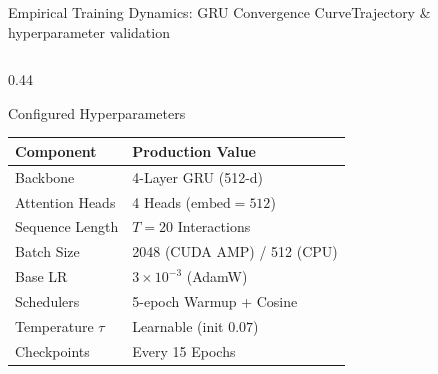 \documentclass[aspectratio=169,10pt]{beamer}
\begin{document}
\begin{frame}{Empirical Training Dynamics: GRU Convergence Curve}{Trajectory \& hyperparameter validation}
\begin{columns}[c]
        \begin{column}{0.44\textwidth}
            \begin{block}{Configured Hyperparameters}
                \fontsize{6pt}{8pt}\selectfont
                \begin{tabular}{ll}
                    \toprule
                    \textbf{Component} & \textbf{Production Value} \\
                    \midrule
                    Backbone & 4-Layer GRU (512-d) \\
                    Attention Heads & 4 Heads ($\text{embed}=512$) \\
                    Sequence Length & $T = 20$ Interactions \\
                    Batch Size & 2048 (CUDA AMP) / 512 (CPU) \\
                    Base LR & $3 \times 10^{-3}$ (AdamW) \\
                    Schedulers & 5-epoch Warmup + Cosine \\
                    Temperature $\tau$ & Learnable (init $0.07$) \\
                    Checkpoints & Every 15 Epochs \\
                    \bottomrule
                \end{tabular}
            \end{block}
        \end{column}
    \end{columns}
\end{frame}
\end{document}
